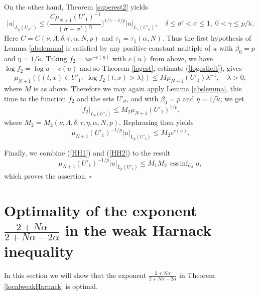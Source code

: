 \documentclass[10pt]{article}
\DeclareMathOperator*{\einf}{ess\,inf}
\begin{document}
On the other hand, Theorem \ref{superest2} yields
\[
|u|_{L_{p}(U_{\sigma'}')}\le \Big(\frac{C\mu_{N+1}(U'_1)^{-1}
}{(\sigma-\sigma')^{\tau_1}}\Big)^{1/\gamma-1/p}
|u|_{L_{\gamma}(U'_\sigma)},\quad \delta\le \sigma'<\sigma\le 1,\;
0<\gamma\le p/\tilde{\kappa}.
\]
Here $C=C(\nu,\Lambda,\delta,\tau,\alpha,N,p)$ and
$\tau_1=\tau_1(\alpha,N)$. Thus the first hypothesis of Lemma
\ref{abslemma} is satisfied by any positive constant multiple of $u$
with $\beta_0=p$ and $\eta=1/\tilde{\kappa}$. Taking $f_2=u
e^{-c(u)}$ with $c(u)$ from above, we have $\log f_2=\log u-c(u)$
and so Theorem \ref{logest}, estimate (\ref{logestleft}), gives
\[ \mu_{N+1}(\{(t,x)\in U'_1:\;\log f_2(t,x)>\lambda\})\le
M\mu_{N+1}(U'_1)\lambda^{-1},\quad \lambda>0,\] where $M$ is as
above. Therefore we may again apply Lemma \ref{abslemma}, this time
to the function $f_2$ and the sets $U'_\sigma$, and with $\beta_0=p$
and $\eta=1/\tilde{\kappa}$; we get
\[
|f_2|_{L_p(U'_\delta)}\le M_2 \mu_{N+1}(U'_1)^{1/p},
\]
where $M_2=M_2(\nu,\Lambda,\delta,\tau,\eta,\alpha,N,p)$. Rephrasing
then yields
\begin{equation} \label{HH2}
\mu_{N+1}(U'_1)^{-1/p}|u|_{L_p(U'_\delta)}\le M_2 e^{c(u)}.
\end{equation}

Finally, we combine (\ref{HH1}) and (\ref{HH2}) to the result
\[ \mu_{N+1}(U'_1)^{-1/p}|u|_{L_p(U'_\delta)}\le M_1 M_2\, \einf_{U_\delta}
u,
\]
which proves the assertion. $\square$
\section{Optimality of the exponent
$\frac{2+N\alpha}{2+N\alpha-2\alpha}$ in the weak Harnack
inequality}
In this section we will show that the exponent
$\frac{2+N\alpha}{2+N\alpha-2\alpha}$ in Theorem
\ref{localweakHarnack} is optimal.
\end{document}
